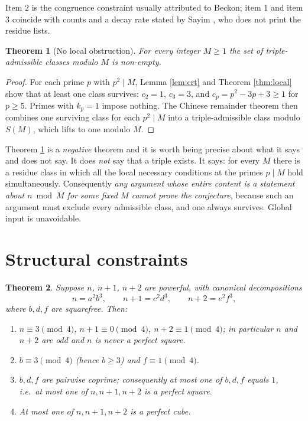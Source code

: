 \documentclass[11pt]{article}
\newtheorem{theorem}{Theorem}[section]
\theoremstyle{definition}
\begin{document}
Item 2 is the congruence constraint usually attributed to Beckon; item 1 and item 3
coincide with counts and a decay rate stated by Sayim \cite{sayim2026}, who does not
print the residue lists.

\begin{theorem}[No local obstruction]\label{thm:nonempty}
For every integer $M\ge1$ the set of triple-admissible classes modulo $M$ is
non-empty.
\end{theorem}

\begin{proof}
For each prime $p$ with $p^2\mid M$, Lemma \ref{lem:crt} and Theorem \ref{thm:local}
show that at least one class survives: $c_2=1$, $c_3=3$, and $c_p=p^2-3p+3\ge1$ for
$p\ge5$. Primes with $k_p=1$ impose nothing. The Chinese remainder theorem then
combines one surviving class for each $p^2\mid M$ into a triple-admissible class
modulo $S(M)$, which lifts to one modulo $M$.
\end{proof}

\begin{remark}\label{rem:whyitmatters}
Theorem \ref{thm:nonempty} is a \emph{negative} theorem and it is worth being
precise about what it says and does not say. It does \emph{not} say that a triple
exists. It says: for every $M$ there is a residue class in which all the local
necessary conditions at the primes $p\mid M$ hold simultaneously. Consequently
\emph{any argument whose entire content is a statement about $n\bmod M$ for some
fixed $M$ cannot prove the conjecture}, because such an argument must exclude every
admissible class, and one always survives. Global input is unavoidable.
\end{remark}

\section{Structural constraints}\label{sec:struct}

\begin{theorem}\label{thm:struct}
Suppose $n$, $n+1$, $n+2$ are powerful, with canonical decompositions
\[ n=a^2b^3,\qquad n+1=c^2d^3,\qquad n+2=e^2f^3, \]
where $b,d,f$ are squarefree. Then:
\begin{enumerate}[label=(\roman*),leftmargin=2.5em]
\item $n\equiv3\pmod4$, $n+1\equiv0\pmod4$, $n+2\equiv1\pmod4$; in particular
$n$ and $n+2$ are odd and $n$ is never a perfect square.
\item $b\equiv3\pmod4$ (hence $b\ge3$) and $f\equiv1\pmod4$.
\item $b,d,f$ are pairwise coprime; consequently at most one of $b,d,f$ equals $1$,
i.e.\ at most one of $n,n+1,n+2$ is a perfect square.
\item At most one of $n,n+1,n+2$ is a perfect cube.
\end{enumerate}
\end{theorem}
\end{document}
